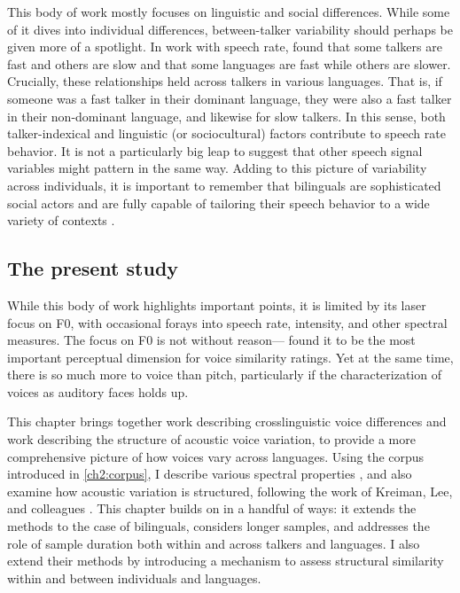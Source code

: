 This body of work mostly focuses on linguistic and social differences. While some of it dives into individual differences, between-talker variability should perhaps be given more of a spotlight. In work with speech rate, \citet{bradlow_2017_rate} found that some talkers are fast and others are slow and that some languages are fast while others are slower. Crucially, these relationships held across talkers in various languages. That is, if someone was a fast talker in their dominant language, they were also a fast talker in their non-dominant language, and likewise for slow talkers. In this sense, both talker-indexical and linguistic (or sociocultural) factors contribute to speech rate behavior. It is not a particularly big leap to suggest that other speech signal variables might pattern in the same way. Adding to this picture of variability across individuals, it is important to remember that bilinguals are sophisticated social actors and are fully capable of tailoring their speech behavior to a wide variety of contexts \citep{bullock_2009_sociophonetics}. 

\subsection{The present study}

While this body of work highlights important points, it is limited by its laser focus on F0, with occasional forays into speech rate, intensity, and other spectral measures. The focus on F0 is not without reason---\citet{perrachione_2019_judgments} found it to be the most important perceptual dimension for voice similarity ratings. Yet at the same time, there is so much more to voice than pitch, particularly if the characterization of voices as auditory faces holds up. 

This chapter brings together work describing crosslinguistic voice differences and work describing the structure of acoustic voice variation, to provide a more comprehensive picture of how voices vary across languages. Using the corpus introduced in \ref{ch2:corpus}, I describe various spectral properties \citet[e.g.][]{ng_2012_ltas}, and also examine how acoustic variation is structured, following the work of Kreiman, Lee, and colleagues \citep{kreiman_2014_theory,lee_2019_acoustic}. This chapter builds on \citet{lee_2019_acoustic} in a handful of ways: it extends the methods to the case of bilinguals, considers longer samples, and addresses the role of sample duration both within and across talkers and languages. I also extend their methods by introducing a mechanism to assess structural similarity within and between individuals and languages. 

